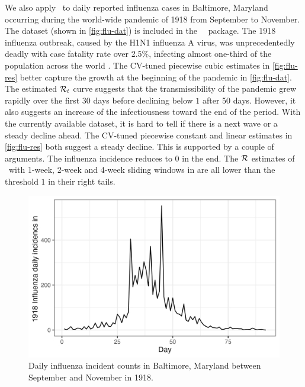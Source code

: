 We also apply \RtEstim\ to daily reported influenza cases in Baltimore, Maryland
occurring during the world-wide pandemic of 1918 from September to November. 
The dataset (shown in \autoref{fig:flu-dat}) is included in the \EpiEstim\ \R\ package. 
The 1918 influenza outbreak, caused by the H1N1 influenza A virus, was unprecedentedly
deadly with case fatality rate over 2.5\%, infecting almost one-third of the population across the world
\citep{taubenberger20061918}. The CV-tuned piecewise cubic estimates in \autoref{fig:flu-res}
better capture the growth at the beginning of the pandemic in \autoref{fig:flu-dat}. 
The estimated $\mathcal{R}_t$ curve suggests that the transmissibility of the pandemic 
grew rapidly over the first 30 days before declining below $1$ after 50 days. 
However, it also suggests an increase of the infectiousness toward the end of the period. 
With the currently available dataset, it is hard to tell if there is a next wave 
or a steady decline ahead. The CV-tuned piecewise 
constant and linear estimates in \autoref{fig:flu-res} both suggest a steady decline. 
This is supported by a couple of arguments. The influenza incidence reduces to $0$ in the end. 
The $\mathcal{R}$ estimates of \EpiEstim\ with 1-week, 2-week and 4-week sliding windows 
in \cite{cori2013new} are all lower than the threshold $1$ in their right tails. 



\begin{figure}[tb]
    \centering
    \includegraphics[width=0.9\linewidth]{fig/flu_dat.png}
    \caption{Daily influenza incident counts in Baltimore, Maryland between September 
    and November in 1918.} 
    \label{fig:flu-dat}
\end{figure} 

